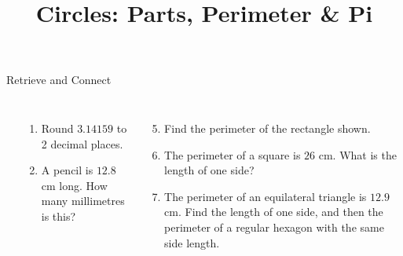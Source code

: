 \documentclass{beamer}
\title{Circles: Parts, Perimeter \& Pi}
\author{}
\date{}
\newcommand{\ablank}[1]{%
  \alt<2>{\textcolor{red}{#1}}{\underline{\phantom{#1}}}%
}
\newcommand{\ashow}[1]{\uncover<2->{\textcolor{red}{\small #1}}}
\newcommand{\ashowq}[1]{\alt<2->{\textcolor{red}{\small #1}}{?}}
\begin{document}
\frame{\titlepage}

\begin{frame}{Retrieve and Connect}


\begin{columns}

\begin{center}
\end{center}

\small
\begin{enumerate}
  \item Round $3.14159$ to 2 decimal places. \ashow{3.14}
  \item A pencil is $12.8$ cm long. How many millimetres is this? \ablank{128 mm}
\end{enumerate}

\begin{enumerate}
  \setcounter{enumi}{4}
  \item Find the perimeter of the rectangle shown. \ashow{25.4 cm}
  \item The perimeter of a square is $26$ cm. What is the length of one side? \ashow{6.5 cm}
  \item  The perimeter of an equilateral triangle is $12.9$ cm. 
    Find the length of one side, and then the perimeter of a regular hexagon with the same side length. \ashow{$4.3$ cm; hexagon: $25.8$ cm}
\end{enumerate}

\end{columns}
\end{frame}
\end{document}

